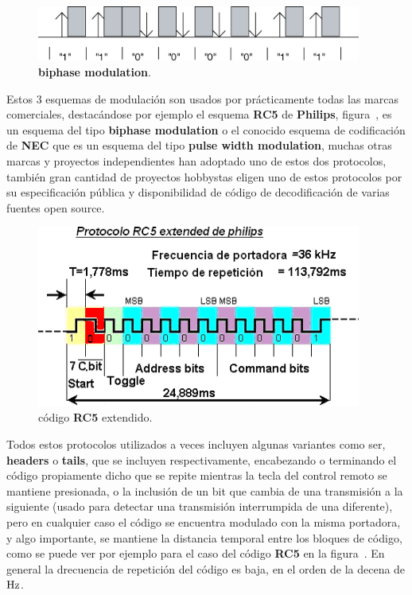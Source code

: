 \begin{figure}[H]
	\centering
	\includegraphics[width=0.95\textwidth]{img/IR/biphase.png}
	\caption{\footnotesize{\textbf{biphase modulation}.}}
	\label{fig:biphase_modulation}
\end{figure}


Estos $3$ esquemas de modulación son usados por prácticamente todas las marcas comerciales, destacándose por ejemplo el esquema \textbf{RC5} de \textbf{Philips}, figura~, es un esquema del tipo \textbf{biphase modulation} o el conocido esquema de codificación de \textbf{NEC} que es un esquema del tipo \textbf{pulse width modulation}, muchas otras marcas y proyectos independientes han adoptado uno de estos dos protocolos, también gran cantidad de proyectos hobbystas eligen uno de estos protocolos por su especificación pública y disponibilidad de código de decodificación de varias fuentes open source.\\

\begin{figure}[H]
	\centering
	\includegraphics[width=0.95\textwidth]{img/IR/RC5_Ext.png}
	\caption{\footnotesize{código \textbf{RC5} extendido.}}
	\label{fig:RC5_coding}
\end{figure}

Todos estos protocolos utilizados a veces incluyen algunas variantes como ser, \textbf{headers} o \textbf{tails}, que se incluyen respectivamente, encabezando o terminando el código propiamente dicho que se repite mientras la tecla del control remoto se mantiene presionada, o la inclusión de un bit que cambia de una transmisión a la siguiente (usado para detectar una transmisión interrumpida de una diferente), pero en cualquier caso el código se encuentra modulado con la misma portadora, y algo importante, se mantiene la distancia temporal entre los bloques de código, como se puede ver por ejemplo para el caso del código \textbf{RC5} en la figura~. En general la drecuencia de repetición del código es baja, en el orden de la decena de $\si[per-mode=symbol]{\hertz}$.


